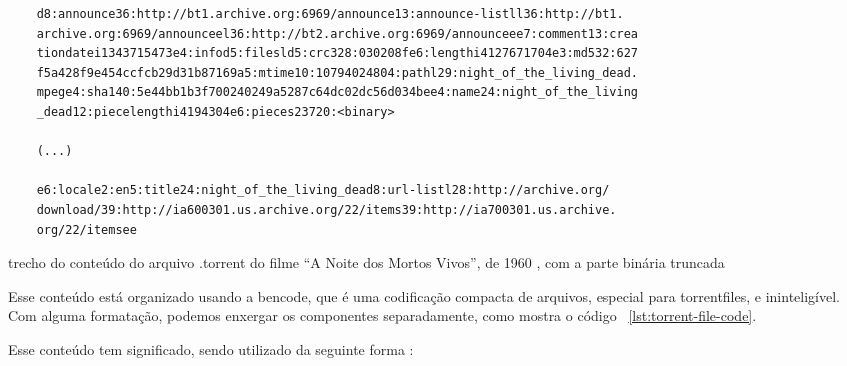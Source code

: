 \begin{listing}[H]
    \begin{verbatim}
    d8:announce36:http://bt1.archive.org:6969/announce13:announce-listll36:http://bt1.
    archive.org:6969/announceel36:http://bt2.archive.org:6969/announceee7:comment13:crea
    tiondatei1343715473e4:infod5:filesld5:crc328:030208fe6:lengthi4127671704e3:md532:627
    f5a428f9e454ccfcb29d31b87169a5:mtime10:10794024804:pathl29:night_of_the_living_dead.
    mpege4:sha140:5e44bb1b3f700240249a5287c64dc02dc56d034bee4:name24:night_of_the_living
    _dead12:piecelengthi4194304e6:pieces23720:<binary>

    (...)

    e6:locale2:en5:title24:night_of_the_living_dead8:url-listl28:http://archive.org/
    download/39:http://ia600301.us.archive.org/22/items39:http://ia700301.us.archive.
    org/22/itemsee
    \end{verbatim}

    \caption{trecho do conteúdo do arquivo .torrent do filme ``A Noite dos Mortos
    Vivos'', de 1960 \cite{torrent-file}, com a parte binária truncada}
    \label{lst:torrent-file-raw}
\end{listing}

Esse conteúdo está organizado usando a \gls{bencode}, que é uma codificação compacta de
arquivos, especial para \glspl*{torrentfile}, e ininteligível. Com alguma formatação,
podemos enxergar os componentes separadamente, como mostra o código
~\ref{lst:torrent-file-code}.

Esse conteúdo tem significado, sendo utilizado da seguinte forma
\cite{wikitheory:bencoding}:

